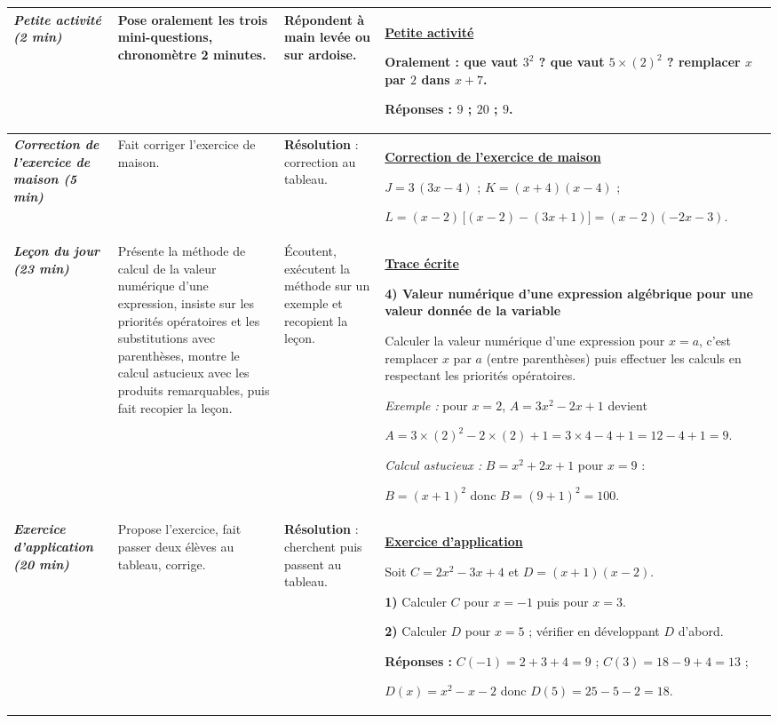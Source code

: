 \documentclass[10pt]{article}
\newcommand{\titreR}[1]{\underline{\textcolor{rougetitre}{\bfseries #1}}}
\newcommand{\app}{\titreR{Exercice d'application}}
\newcommand{\seance}[1]{\fcolorbox{bleuseance}{bleufond}{\textcolor{bleuseance}{\bfseries #1}}}
\newcommand{\moment}[1]{\textbf{\itshape #1}}
\newcommand{\mclef}[1]{\colorbox{jaunesurl}{#1}}
\begin{document}
\begin{longtable}{|p{2.35cm}|p{5.35cm}|p{4.55cm}|p{13.85cm}|}
\hline
\seance{SEANCE 5} \newline \moment{Petite activité (2 min)} &
Pose oralement les trois mini-questions, chronomètre 2 minutes. &
Répondent à main levée ou sur ardoise. &
\titreR{Petite activité} \par
Oralement : que vaut $3^2$ ? \; que vaut $5\times(2)^2$ ? \; remplacer $x$ par $2$ dans
$x+7$. \par
\textbf{Réponses :} $9$ ; \; $20$ ; \; $9$. \\ \hline

\moment{Correction de l'exercice de maison (5 min)} &
Fait corriger l'exercice de maison. &
\textbf{Résolution} : correction au tableau. &
\titreR{Correction de l'exercice de maison} \par
$J=3\,(3x-4)$ ; \; $K=(x+4)(x-4)$ ; \par
$L=(x-2)\,\big[(x-2)-(3x+1)\big]=(x-2)(-2x-3)$. \\ \hline

\moment{Leçon du jour (23 min)} &
Présente la méthode de calcul de la valeur numérique d'une expression, insiste sur
les priorités opératoires et les substitutions avec parenthèses, montre le calcul
astucieux avec les produits remarquables, puis fait recopier la leçon. &
Écoutent, exécutent la méthode sur un exemple et recopient la leçon. &
\titreR{Trace écrite} \par
\textbf{4) Valeur numérique d'une expression algébrique pour une valeur donnée de
la variable} \par
Calculer la \mclef{valeur numérique} d'une expression pour $x=a$, c'est remplacer
$x$ par $a$ (entre parenthèses) puis effectuer les calculs en respectant les priorités
opératoires. \par
\textit{Exemple :} pour $x=2$, \; $A=3x^2-2x+1$ devient \par
$A=3\times(2)^2-2\times(2)+1=3\times4-4+1=12-4+1=9$. \par
\textit{Calcul astucieux :} $B=x^2+2x+1$ pour $x=9$ : \par
$B=(x+1)^2$ donc $B=(9+1)^2=100$. \\ \hline

\moment{Exercice d'application (20 min)} &
Propose l'exercice, fait passer deux élèves au tableau, corrige. &
\textbf{Résolution} : cherchent puis passent au tableau. &
\app \par
Soit $C=2x^2-3x+4$ et $D=(x+1)(x-2)$. \par
\textbf{1)} Calculer $C$ pour $x=-1$ puis pour $x=3$. \par
\textbf{2)} Calculer $D$ pour $x=5$ ; vérifier en développant $D$ d'abord. \par
\textbf{Réponses :} $C(-1)=2+3+4=9$ ; \; $C(3)=18-9+4=13$ ; \par
$D(x)=x^2-x-2$ donc $D(5)=25-5-2=18$. \\ \hline


\end{longtable}
\end{document}
